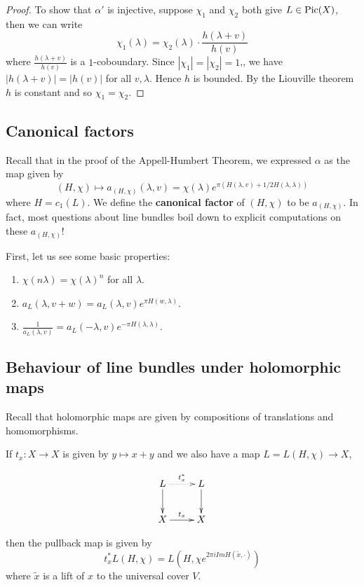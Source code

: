 \begin{proof}
To show that $\alpha'$ is injective, 
suppose $\chi_1$ and $\chi_2$ both give $L\in \operatorname{Pic}(X)$, then we can write
$$\chi_1(\lambda)=\chi_2(\lambda)\cdot \frac{h(\lambda+v)}{h(v)}$$
where $\frac{h(\lambda+v)}{h(v)}$ is a $1$-coboundary. Since $|\chi_1|=|\chi_2|=1$,, we have $|h(\lambda+v)|=|h(v)|$ for all $v,\lambda$. Hence $h$ is bounded. By the Liouville theorem $h$ is constant and so $\chi_1=\chi_2$. 

\end{proof}


\subsection{Canonical factors}
Recall that in the proof of the Appell-Humbert Theorem, we expressed $\alpha$ as the map given by 
$$(H,\chi)\mapsto a_{(H,\chi)} (\lambda,v)=\chi(\lambda)e^{\pi (H(\lambda,v)+1/2 H(\lambda,\lambda))}$$
where $H=c_1(L)$. We define the \textbf{canonical factor} of $(H,\chi)$ to be $a_{(H,\chi)}$. In fact, most questions about line bundles boil down to explicit computations on these $a_{(H,\chi)}$! 

First, let us see some basic properties:
\begin{enumerate}
\item $\chi(n\lambda)=\chi(\lambda)^n$ for all $\lambda$.
\item $a_L(\lambda,v+w)=a_L(\lambda,v)e^{\pi H(w,\lambda)}$.
\item $\frac{1}{a_L(\lambda,v)}=a_L(-\lambda,v)e^{-\pi H(\lambda,\lambda)}$. 
\end{enumerate}

\subsection{Behaviour of line bundles under holomorphic maps}
Recall that holomorphic maps are given by compositions of translations and homomorphisms. 

\begin{lemma}
If $t_x:X\to X$ is given by $y\mapsto x+y$ and we also have a map $L=L(H,\chi)\to X$, 

\[
\xymatrix{
L \ar@{.>}[r]^{t^*_x} \ar[d] & L \ar[d]\\
X \ar[r]^{t_x} & X\\
}
\]


then the pullback map is given by  
$$t_x^* L(H,\chi)=L(H,\chi e^{2\pi i Im H(\tilde{x},\cdot)})$$
where $\tilde{x}$ is a lift of $x$ to the universal cover $V$. 
\end{lemma}


